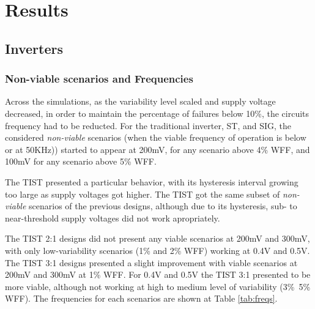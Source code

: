 \documentclass[pgmicro,mestrado,english]{iiufrgs}
\begin{document}
\chapter{Results}

\section{Inverters}

\subsection{Non-viable scenarios and Frequencies}

Across the simulations, as the variability level scaled and supply voltage decreased, in order to maintain the percentage of failures below 10\%, the circuits frequency had to be reducted. For the traditional inverter, ST, and SIG, the considered \textit{non-viable} scenarios (when the viable frequency of operation is below or at 50KHz)) started to appear at 200mV, for any scenario above 4\% WFF, and 100mV for any scenario above 5\% WFF.

The TIST presented a particular behavior, with its hysteresis interval growing too large as supply voltages got higher. The TIST got the same subset of \textit{non-viable} scenarios of the previous designs, although due to its hysteresis, sub- to near-threshold supply voltages did not work apropriately.

The TIST 2:1 designs did not present any viable scenarios at 200mV and 300mV, with only low-variability scenarios (1\% and 2\% WFF) working at 0.4V and 0.5V. The TIST 3:1 designs presented a slight improvement with viable scenarios at 200mV and 300mV at 1\% WFF. For 0.4V and 0.5V the TIST 3:1 presented to be more viable, although not working at high to medium level of variability (3\%~5\% WFF). The frequencies for each scenarios are shown at Table \ref{tab:freqs}.
\end{document}
